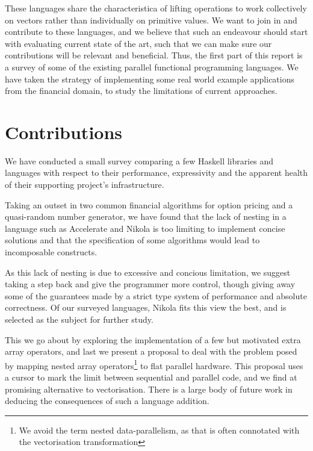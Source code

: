 These languages share the characteristica of lifting operations to
work collectively on vectors rather than individually on primitive
values. We want to join in and contribute to these languages, and we
believe that such an endeavour should start with evaluating current
state of the art, such that we can make sure our contributions will be
relevant and beneficial. Thus, the first part of this report is a
survey of some of the existing parallel functional programming
languages. We have taken the strategy of implementing some real world
example applications from the financial domain, to study the
limitations of current approaches.


\section{Contributions}

We have conducted a small survey comparing a few Haskell libraries and
languages with respect to their performance, expressivity and the apparent
health of their supporting project's infrastructure.

Taking an outset in two common financial algorithms for option pricing
and a quasi-random number generator, we have found that the lack of
nesting in a language such as Accelerate and Nikola is too limiting to
implement concise solutions and that the specification of some
algorithms would lead to incomposable constructs.

As this lack of nesting is due to excessive and concious limitation,
we suggest taking a step back and give the programmer more control,
though giving away some of the guarantees made by a strict type system
of performance and absolute correctness. Of our surveyed languages,
Nikola fits this view the best, and is selected as the subject for
further study.

This we go about by exploring the implementation of a few but
motivated extra array operators, and last we present a proposal to
deal with the problem posed by mapping nested array
operators\footnote{We avoid the term nested data-parallelism, as that
  is often connotated with the vectorisation transformation} to flat
parallel hardware. This proposal uses a cursor to mark the limit
between sequential and parallel code, and we find at promising
alternative to vectorisation. There is a large body of future work in
deducing the consequences of such a language addition.


